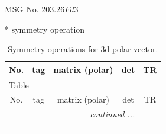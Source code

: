 \documentclass[fleqn,8pt]{jsarticle}
\begin{document}
\setcounter{MaxMatrixCols}{32}

\renewcommand{\tablename}{Table~}
\renewcommand{\figurename}{Figure~}
\begin{center}
\LARGE
MSG No. 203.26\quad$Fd\bar{3}$
\end{center}
* symmetry operation
\renewcommand{\arraystretch}{1.3}
\begin{longtable}{ccccc}
\caption{Symmetry operations for 3d polar vector.}
 \\
 \hline \hline
No. & tag & matrix (polar) & det & TR \\ \hline \endfirsthead

\multicolumn{4}{l}{\tablename\ \thetable{}} \\
 \hline \hline
No. & tag & matrix (polar) & det & TR \\ \hline \endhead

 \hline \hline
\multicolumn{4}{r}{\footnotesize\it continued ...} \\ \endfoot

 \hline \hline
\multicolumn{4}{r}{} \\ \endlastfoot


\end{longtable}
\end{document}
